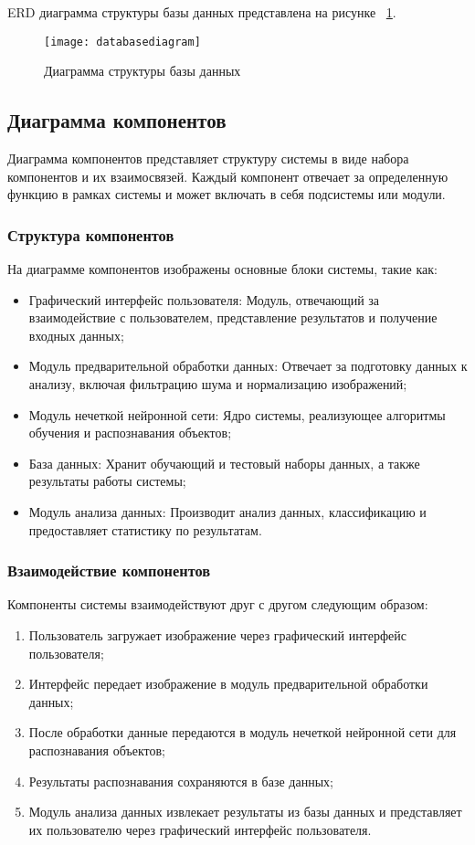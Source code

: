 ERD диаграмма структуры базы данных представлена на рисунке ~\ref{databasediagram:image}.

\begin{figure}[ht]
\texttt{[image: databasediagram]}
\caption{Диаграмма структуры базы данных}
\label{databasediagram:image}
\end{figure}

\subsection{Диаграмма компонентов}

Диаграмма компонентов представляет структуру системы в виде набора компонентов и их взаимосвязей. Каждый компонент отвечает за определенную функцию в рамках системы и может включать в себя подсистемы или модули.

\subsubsection{Структура компонентов}
На диаграмме компонентов изображены основные блоки системы, такие как:

\begin{itemize}
\item Графический интерфейс пользователя: Модуль, отвечающий за взаимодействие с пользователем, представление результатов и получение входных данных;
\item Модуль предварительной обработки данных: Отвечает за подготовку данных к анализу, включая фильтрацию шума и нормализацию изображений;
\item Модуль нечеткой нейронной сети: Ядро системы, реализующее алгоритмы обучения и распознавания объектов;
\item База данных: Хранит обучающий и тестовый наборы данных, а также результаты работы системы;
\item Модуль анализа данных: Производит анализ данных, классификацию и предоставляет статистику по результатам.
\end{itemize}

\subsubsection{Взаимодействие компонентов}
Компоненты системы взаимодействуют друг с другом следующим образом:

\begin{enumerate}
\item Пользователь загружает изображение через графический интерфейс пользователя;
\item Интерфейс передает изображение в модуль предварительной обработки данных;
\item После обработки данные передаются в модуль нечеткой нейронной сети для распознавания объектов;
\item Результаты распознавания сохраняются в базе данных;
\item Модуль анализа данных извлекает результаты из базы данных и представляет их пользователю через графический интерфейс пользователя.
\end{enumerate}

